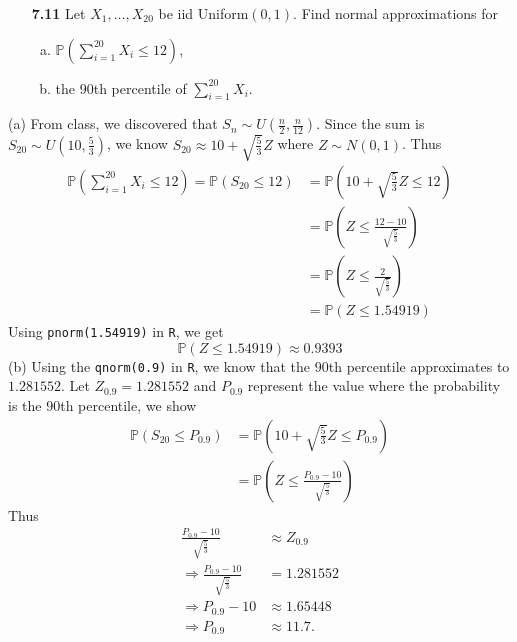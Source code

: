 \documentclass[11pt]{article}
\theoremstyle{definition}
\renewcommand{\P}{\mathbb{P}}
\newcommand{\1}[1]{\mathbf{1} \left \{ #1 \right \}}
\begin{document}
\begin{itemize}
\item[{\color{red} \textbf{7.11}}] Let $X_1, \ldots, X_{20}$ be iid Uniform$(0,1)$. Find normal approximations for
\begin{enumerate}[(a)]
\item $\P \left( \sum_{i=1}^{20} X_i \leq 12 \right)$,
\item the 90th percentile of $\sum_{i=1}^{20} X_i$.
\end{enumerate}
\end{itemize}
(a) From class, we discovered that $S_n \sim U\left(\frac{n}{2}, \frac{n}{12}\right)$.  Since the sum is $S_{20} \sim U\left(10, \frac{5}{3}\right)$, we know $S_{20} \approx 10 + \sqrt{\frac{5}{3}}Z$ where $Z \sim N(0,1)$.  Thus
\begin{align*}
    \P\left(\sum_{i=1}^{20} X_i \leq 12\right) = \P\left(S_{20} \leq 12\right) &= \P\left(10 + \sqrt{\frac{5}{3}}Z \leq 12\right) \\
    &= \P\left(Z \leq \frac{12 - 10}{\sqrt{\frac{5}{3}}}\right) \\
    &= \P\left(Z \leq \frac{2}{\sqrt{\frac{5}{3}}}\right) \\
    &= \P(Z \leq 1.54919)
\end{align*}
Using \texttt{pnorm(1.54919)} in \texttt{R}, we get
\[\P(Z \leq 1.54919) \approx 0.9393\]
(b) Using the \texttt{qnorm(0.9)} in \texttt{R}, we know that the $90$th percentile approximates to $1.281552$.  Let $Z_{0.9} = 1.281552$ and $P_{0.9}$ represent the value where the probability is the $90$th percentile, we show
\begin{align*}
    \P\left(S_{20} \leq P_{0.9}\right) &= \P\left(10 + \sqrt{\frac{5}{3}}Z \leq P_{0.9}\right) \\
    &= \P\left(Z \leq \frac{P_{0.9} - 10}{\sqrt{\frac{5}{3}}}\right)
\end{align*}
Thus
\begin{align*}
    \frac{P_{0.9} - 10}{\sqrt{\frac{5}{3}}} &\approx Z_{0.9} \\
    \Rightarrow \frac{P_{0.9} - 10}{\sqrt{\frac{5}{3}}} &= 1.281552 \\
    \Rightarrow P_{0.9} - 10 &\approx 1.65448 \\
    \Rightarrow P_{0.9} &\approx 11.7.
\end{align*}
\end{document}
